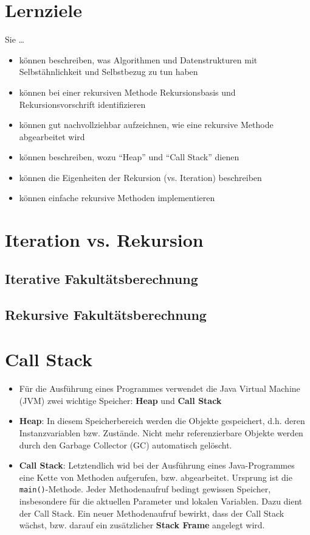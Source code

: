 \documentclass[10pt,a4paper]{article}
\begin{document}
\section{Lernziele}
Sie \dots
\begin{itemize}[noitemsep,topsep=0pt,leftmargin=*]
    \item können beschreiben, was Algorithmen und Datenstrukturen mit Selbstähnlichkeit und Selbstbezug zu tun haben
    \item können bei einer rekursiven Methode Rekursionsbasis und Rekursionsvorschrift identifizieren
    \item können gut nachvollziehbar aufzeichnen, wie eine rekursive Methode abgearbeitet wird
    \item können beschreiben, wozu "`Heap"' und "`Call Stack"' dienen
    \item können die Eigenheiten der Rekursion (vs. Iteration) beschreiben
    \item können einfache rekursive Methoden implementieren
\end{itemize}

\section{Iteration vs. Rekursion}
\subsection{Iterative Fakultätsberechnung}
\subsection{Rekursive Fakultätsberechnung}
\section{Call Stack}
\begin{itemize}[noitemsep,topsep=0pt,leftmargin=*]
    \item Für die Ausführung eines Programmes verwendet die Java Virtual Machine (JVM) zwei wichtige Speicher: \textbf{Heap} und \textbf{Call Stack}
    \item \textbf{Heap}: In diesem Speicherbereich werden die Objekte gespeichert, d.h. deren Instanzvariablen bzw. Zustände. Nicht mehr referenzierbare Objekte werden durch den Garbage Collector (GC) automatisch gelöscht.
    \item \textbf{Call Stack}: Letztendlich wid bei der Ausführung eines Java-Programmes eine Kette von Methoden aufgerufen, bzw. abgearbeitet. Ursprung ist die \texttt{main()}-Methode. Jeder Methodenaufruf bedingt gewissen Speicher, insbesondere für die aktuellen Parameter und lokalen Variablen. Dazu dient der Call Stack. Ein neuer Methodenaufruf bewirkt, dass der Call Stack wächst, bzw. darauf ein zusätzlicher \textbf{Stack Frame} angelegt wird.
\end{itemize}
\end{document}
